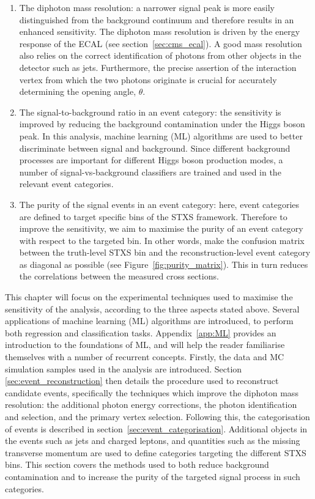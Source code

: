 \begin{enumerate}
    \item The diphoton mass resolution: a narrower signal peak is more easily distinguished from the background continuum and therefore results in an enhanced sensitivity. The diphoton mass resolution is driven by the energy response of the ECAL (see section~\ref{sec:cms_ecal}). A good mass resolution also relies on the correct identification of photons from other objects in the detector such as jets. Furthermore, the precise assertion of the interaction vertex from which the two photons originate is crucial for accurately determining the opening angle, $\theta$.
    
    \item The signal-to-background ratio in an event category: the sensitivity is improved by reducing the background contamination under the Higgs boson peak. In this analysis, machine learning (ML) algorithms are used to better discriminate between signal and background. Since different background processes are important for different Higgs boson production modes, a number of signal-vs-background classifiers are trained and used in the relevant event categories.
    
    \item The purity of the signal events in an event category: here, event categories are defined to target specific bins of the STXS framework. Therefore to improve the sensitivity, we aim to maximise the purity of an event category with respect to the targeted bin. In other words, make the confusion matrix between the truth-level STXS bin and the reconstruction-level event category as diagonal as possible (see Figure~\ref{fig:purity_matrix}). This in turn reduces the correlations between the measured cross sections.
\end{enumerate}

This chapter will focus on the experimental techniques used to maximise the sensitivity of the analysis, according to the three aspects stated above. Several applications of machine learning (ML) algorithms are introduced, to perform both regression and classification tasks. Appendix~\ref{app:ML} provides an introduction to the foundations of ML, and will help the reader familiarise themselves with a number of recurrent concepts. Firstly, the data and MC simulation samples used in the analysis are introduced. Section \ref{sec:event_reconstruction} then details the procedure used to reconstruct candidate \Hgg events, specifically the techniques which improve the diphoton mass resolution: the additional photon energy corrections, the photon identification and selection, and the primary vertex selection. Following this, the categorisation of events is described in section~\ref{sec:event_categorisation}. Additional objects in the events such as jets and charged leptons, and quantities such as the missing transverse momentum are used to define categories targeting the different STXS bins. This section covers the methods used to both reduce background contamination and to increase the purity of the targeted signal process in such categories.

